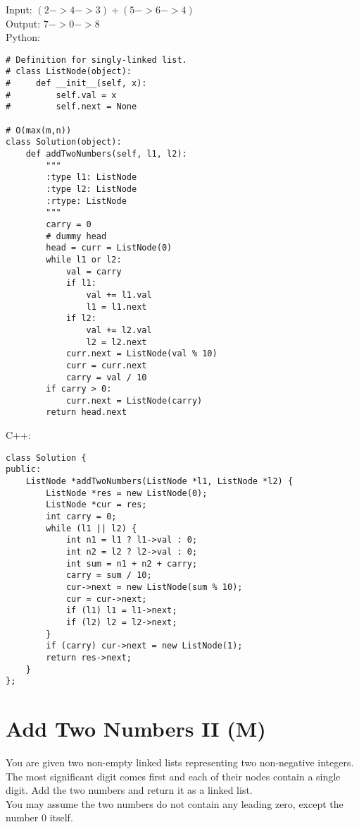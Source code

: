 Input: $(2 -> 4 -> 3) + (5 -> 6 -> 4)$ \\
Output: $7 -> 0 -> 8$\\

Python:
\lstset{language=python}
\begin{lstlisting}
# Definition for singly-linked list.
# class ListNode(object):
#     def __init__(self, x):
#         self.val = x
#         self.next = None

# O(max(m,n))
class Solution(object):
    def addTwoNumbers(self, l1, l2):
        """
        :type l1: ListNode
        :type l2: ListNode
        :rtype: ListNode
        """
        carry = 0
        # dummy head
        head = curr = ListNode(0)
        while l1 or l2:
            val = carry
            if l1:
                val += l1.val
                l1 = l1.next
            if l2:
                val += l2.val
                l2 = l2.next
            curr.next = ListNode(val % 10)
            curr = curr.next
            carry = val / 10
        if carry > 0:
            curr.next = ListNode(carry)
        return head.next
\end{lstlisting}

C++:
\lstset{language=C++}
\begin{lstlisting}
class Solution {
public:
    ListNode *addTwoNumbers(ListNode *l1, ListNode *l2) {
        ListNode *res = new ListNode(0);
        ListNode *cur = res;
        int carry = 0;
        while (l1 || l2) {
            int n1 = l1 ? l1->val : 0;
            int n2 = l2 ? l2->val : 0;
            int sum = n1 + n2 + carry;
            carry = sum / 10;
            cur->next = new ListNode(sum % 10);
            cur = cur->next;
            if (l1) l1 = l1->next;
            if (l2) l2 = l2->next;
        }
        if (carry) cur->next = new ListNode(1);
        return res->next;
    }
};
\end{lstlisting}

\section{Add Two Numbers II (M)}
You are given two non-empty linked lists representing two non-negative integers. The most significant digit comes first and each of their nodes contain a single digit. Add the two numbers and return it as a linked list.\\

You may assume the two numbers do not contain any leading zero, except the number 0 itself.\\

